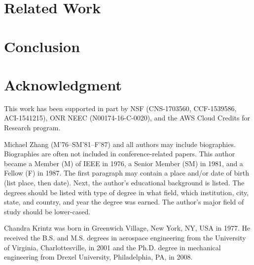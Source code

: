 \documentclass{ieeeaccess}
\begin{document}
\section{Related Work}
\label{sec:relate_work}



\section{Conclusion}
\label{sec:conclusion}


\section*{Acknowledgment}
This work has been supported in part by NSF (CNS-1703560, CCF-1539586,
ACI-1541215), ONR NEEC (N00174-16-C-0020),
and the AWS Cloud Credits for Research program.

\begin{IEEEbiography}{Michael Zhang} (M'76--SM'81--F'87) and all authors may include 
biographies. Biographies are often not included in conference-related
papers. This author became a Member (M) of IEEE in 1976, a Senior
Member (SM) in 1981, and a Fellow (F) in 1987. The first paragraph may
contain a place and/or date of birth (list place, then date). Next,
the author's educational background is listed. The degrees should be
listed with type of degree in what field, which institution, city,
state, and country, and year the degree was earned. The author's major
field of study should be lower-cased. 


\end{IEEEbiography}

\begin{IEEEbiography}{Chandra Krintz} was born in Greenwich Village, New York, NY, USA in 
1977. He received the B.S. and M.S. degrees in aerospace engineering from 
the University of Virginia, Charlottesville, in 2001 and the Ph.D. degree in 
mechanical engineering from Drexel University, Philadelphia, PA, in 2008.

\end{IEEEbiography}
\end{document}
